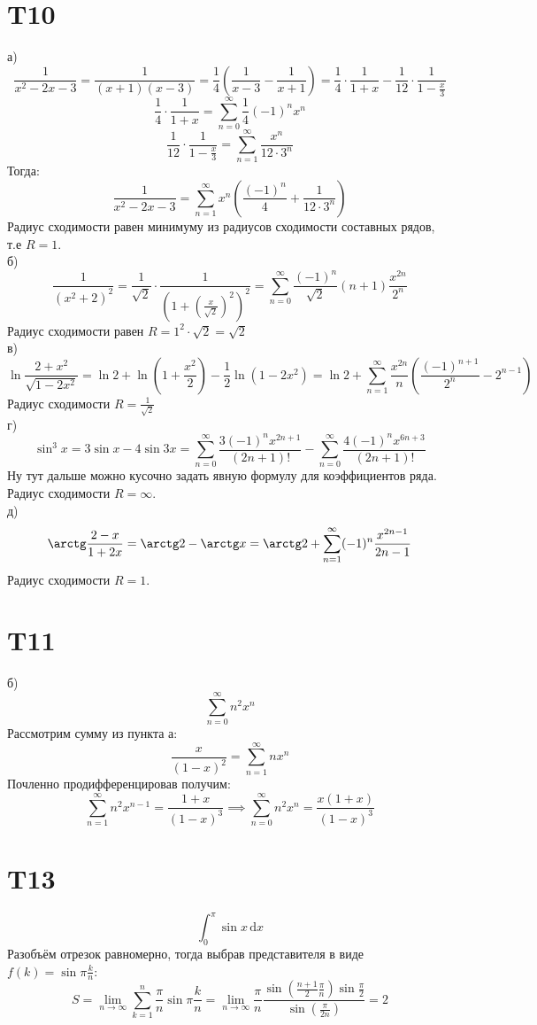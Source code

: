 \documentclass[12pt]{article}
\begin{document}
\section{T10}
а)
\[
    \frac{1}{x^2 - 2x - 3} = \frac{1}{(x+1)(x-3)} = \frac{1}{4} \left( \frac{1}{x - 3} - \frac{1}{x + 1} \right) =
    \frac{1}{4} \cdot \frac{1}{1 + x} - \frac{1}{12} \cdot \frac{1}{1 - \frac{x}{3}}
\]
\[
    \frac{1}{4} \cdot \frac{1}{1 + x} = \sum_{n=0}^{\infty} \frac{1}{4} (-1)^n x^n
\]
\[
    \frac{1}{12} \cdot \frac{1}{1 - \frac{x}{3}} = \sum_{n=1}^{\infty} \frac{x^n}{12 \cdot 3^n}
\]
Тогда:
\[
    \frac{1}{x^2 - 2x - 3} = \sum_{n=1}^{\infty} x^n \left( \frac{(-1)^n}{4} + \frac{1}{12 \cdot 3^n} \right)
\]
Радиус сходимости равен минимуму из радиусов сходимости составных рядов, т.е $R = 1$.
\\ б)
\[
    \frac{1}{(x^2 + 2)^2} = \frac{1}{\sqrt{2}} \cdot \frac{1}{\left( 1 + \left( \frac{x}{\sqrt{2}} \right)^2 \right)^2 } = \sum_{n=0}^{\infty} \frac{(-1)^n}{\sqrt{2}} (n + 1) \frac{x^{2n}}{2^n}
\]
Радиус сходимости равен $R = 1^2 \cdot \sqrt{2} = \sqrt{2}$
\\ в)
\[
    \ln \frac{2 + x^2}{\sqrt{1 - 2x^2}} =
    \ln 2 + \ln \left( 1 + \frac{x^2}{2} \right)  - \frac{1}{2} \ln \left( 1 - 2x^2 \right)  =
    \ln 2 + \sum_{n=1}^{\infty} \frac{x^{2n}}{n} \left( \frac{(-1)^{n+1}}{2^n} - 2^{n-1} \right)
\]
Радиус сходимости $R = \frac{1}{\sqrt{2}}$
\\ г)
\[
    \sin^3 x = 3\sin x - 4\sin 3x = \sum_{n=0}^{\infty} \frac{3 (-1)^n x^{2n + 1}}{(2n + 1)!} - \sum_{n=0}^{\infty} \frac{4 (-1)^n x^{6n + 3}}{(2n + 1)!}
\]
Ну тут дальше можно кусочно задать явную формулу для коэффициентов ряда. Радиус сходимости $R = \infty$.
\\ д)
\[
    \arctg \frac{2 - x}{1 + 2x} = \arctg 2 - \arctg x = \arctg 2 + \sum_{n=1}^{\infty} (-1)^n \frac{x^{2n-1}}{2n-1}
\]
Радиус сходимости $R = 1$.
\section{T11}
б)
\[
    \sum_{n=0}^{\infty} n^2 x^n
\]
Рассмотрим сумму из пункта а:
\[
    \frac{x}{(1 - x)^2} = \sum_{n=1}^{\infty} n x^n
\]
Почленно продифференцировав получим:
\[
    \sum_{n=1}^{\infty} n^2 x^{n - 1} = \frac{1 + x}{(1 - x)^3} \implies \sum_{n=0}^{\infty} n^2 x^n = \frac{x(1 + x)}{(1 - x)^{3} }
\]
\section{T13}
\[
    \int_{0}^{\pi } \sin x \,\mathrm{d}x
\]
Разобъём отрезок равномерно, тогда выбрав представителя в виде $f(k) = \sin \pi \frac{k}{n}$:
\[
    S = \lim_{n \to \infty} \sum_{k=1}^{n} \frac{\pi }{n} \sin \pi \frac{k}{n} = \lim_{n \to \infty} \frac{\pi}{n} \frac{\sin \left( \frac{n+1}{2} \frac{\pi}{n} \right) \sin \frac{\pi}{2}}{\sin \left( \frac{\pi}{2n} \right) } = 2
\]
\end{document}
